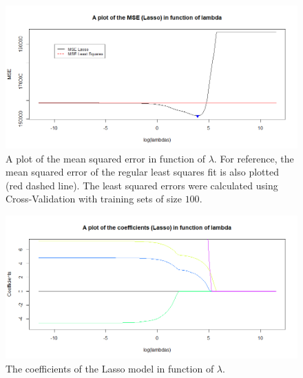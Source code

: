 \begin{figure}
    \centering
    \includegraphics[width=\linewidth]{Figures/LASSOVSLSS.png}
    \caption{A plot of the mean squared error in function of $\lambda$. For reference, the mean squared error of the regular least squares fit is also plotted (red dashed line). The least squared errors were calculated using Cross-Validation with training sets of size $100$.}
    \label{fig:LassoVSLSS}
\end{figure}

\begin{figure}
    \centering
    \includegraphics[width = \linewidth]{Figures/CoeffLASSOIFOLambda.png}
    \caption{The coefficients of the Lasso model in function of $\lambda$.}
    \label{fig:CoeffLasso}
\end{figure}


